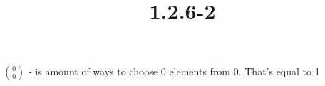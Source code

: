 \documentclass{article}
\title{1.2.6-2}
\begin{document}
\maketitle

\( \binom{0}{0} \) - is amount of ways to choose 0 elements from 0. That's equal to 1
\end{document}

